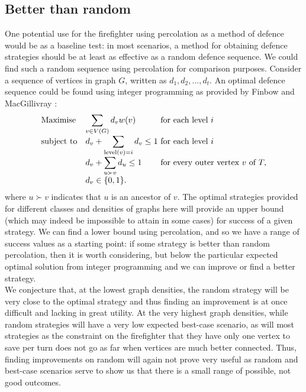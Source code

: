 \documentclass[11pt]{amsart}
\begin{document}
\subsection{Better than random}
One potential use for the firefighter using percolation as a method of defence would be as a baseline test: in most scenarios, a method for obtaining defence strategies should be at least as effective as a random defence sequence. We could find such a random sequence using percolation for comparison purposes. Consider a sequence of vertices in graph $G$, written as $d_1, d_2,\dots, d_t$. An optimal defence sequence could be found using integer programming as provided by Finbow and MacGillivray \cite{finbow09}:
\begin{equation*}
	\begin{array}{ll@{}ll}
\text{Maximise}  & \displaystyle \sum\limits_{v\in V(G)} d_v w(v) &\text{~for each level~} i\\
\text{subject to}& d_v + \displaystyle\sum\limits_{\text{level}(v)=i} d_v \leq 1  &\text{~for each level~} i\\
				 & d_v + \displaystyle\sum\limits_{u\succ v}  d_u \leq 1  &\text{~for every outer vertex~} v \text{~of~} T,\\
                 &d_{v} \in \{0,1\}. &
	\end{array}
\end{equation*}
where $u\succ v$ indicates that $u$ is an ancestor of $v$. The optimal strategies provided for different classes and densities of graphs here will provide an upper bound (which may indeed be impossible to attain in some cases) for success of a given strategy. We can find a lower bound using percolation, and so we have a range of success values as a starting point: if some strategy is better than random percolation, then it is worth considering, but below the particular expected optimal solution from integer programming and we can improve or find a better strategy.\\

We conjecture that, at the lowest graph densities, the random strategy will be very close to the optimal strategy and thus finding an improvement is at once difficult and lacking in great utility. At the very highest graph densities, while random strategies will have a very low expected best-case scenario, as will most strategies as the constraint on the firefighter that they have only one vertex to save per turn does not go as far when vertices are much better connected. Thus, finding improvements on random will again not prove very useful as random and best-case scenarios serve to show us that there is a small range of possible, not good outcomes.
\end{document}
